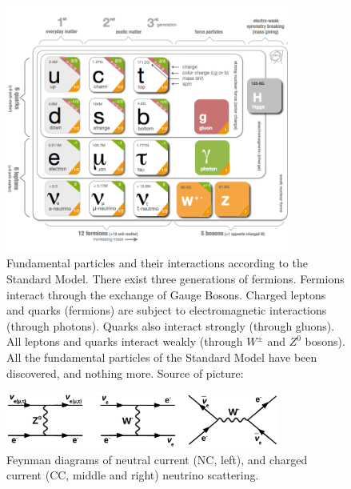 \begin{figure}
\caption{Fundamental particles and their interactions according to the Standard Model. There exist three generations of fermions. Fermions interact through the exchange of Gauge Bosons. Charged leptons and quarks (fermions) are subject to electromagnetic interactions (through photons). Quarks also interact strongly (through gluons). All leptons and quarks interact weakly (through $W^{\pm}$ and $Z^0$ bosons). All the fundamental particles of the Standard Model have been discovered, and nothing more. Source of picture: \cite{ref_fig_StandardModel}}
\label{fig:StandardModel}
\centering 
\includegraphics[width=0.83\textwidth, keepaspectratio=true]{figs/StandardModel.png}
\end{figure}

\begin{figure}
\caption{Feynman diagrams of neutral current (NC, left), and charged current (CC, middle and right) neutrino scattering.}
\label{fig:NuScattering}
\centering
\includegraphics[width=0.80\textwidth, keepaspectratio=true]{figs/neutrinoScattering.png}
\end{figure}


